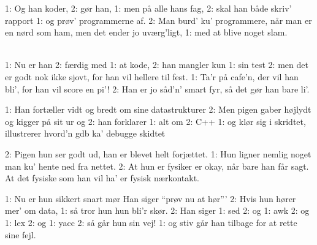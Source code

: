 {1: Og han koder, 2: gør han,
1: men på alle hans fag,
2: skal han både skriv' rapport
1: og prøv' programmerne af.
2: Man burd' ku' programmere,
når man er en nørd som ham,
men det ender jo uværg'ligt,
1: med at blive noget slam.


\\
1: Nu er han 2: færdig med 1: at kode,
2: han mangler kun 1: sin test
2: men det er godt nok ikke sjovt,
for han vil hellere til fest.
1: Ta'r på cafe'n, der vil han bli',
for han vil score en pi'!
2: Han er jo såd'n' smart fyr,
så det gør han bare li'.

1: Han fortæller vidt og bredt
om sine datastrukturer
2: Men pigen gaber højlydt
og kigger på sit ur og
2: han forklarer 1: alt om 2: C++
1: og klør sig i skridtet,
illustrerer hvord'n gdb
ka' debugge skidtet

2: Pigen hun ser godt ud,
han er blevet helt forjættet.
1: Hun ligner nemlig noget
man ku' hente ned fra nettet.
2: At hun er fysiker er okay,
når bare han får sagt.
At det fysiske som han vil ha'
er fysisk nærkontakt.

1: Nu er hun sikkert snart mør
Han siger ``prøv nu at hør'''
2: Hvis hun hører mer' om data,
1: så tror hun hun bli'r skør.
2: Han siger 1: sed 2: og 1: awk
2: og 1: lex 2: og 1: yacc
2: så går hun sin vej!
1: og stiv går han tilbage
for at rette sine fejl.
}

